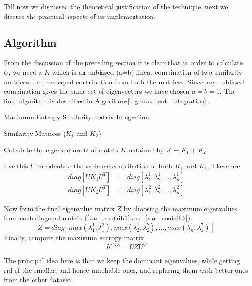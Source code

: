 Till now we discussed the theoretical justification of the technique, next we discuss the practical aspects of its implementation.

\subsection{Algorithm}
From the discussion of the preceding section it is clear that in order to calculate $U$, we need a $K$ which is an unbiased (a=b) linear combination of two similarity matrices, i.e., has equal contribution from both the matrices. Since any unbiased combination gives the same set of eigenvectors we have chosen $a=b=1$. The final algorithm is described in Algorithm-\ref{alg:max_ent_integration}.

\begin{algorithm}[h]
\caption{Maximum Entropy Similarity matrix Integration}
\label{alg:max_ent_integration}
\begin{algorithmic}[1]
\REQUIRE Similarity Matrices ($K_{1}$ and $K_{2}$) 

\STATE Calculate the eigenvectors $U$ of matrix $K$ obtained by $K = K_{1} + K_{2}$.

\STATE Use this $U$ to calculate the variance contribution of both $K_{1}$ and $K_{2}$. These are  
\begin{eqnarray}
	diag[UK_{1}U^{T}] &=&  diag[\lambda^{1}_{1},\lambda^{1}_{2},\dots,\lambda^{1}_{n}] \label{var_contrib1} \\
	diag[UK_{2}U^{T}] &=&  diag[\lambda^{2}_{1},\lambda^{2}_{2},\dots,\lambda^{2}_{n}] \label{var_contrib2}
\end{eqnarray}

\STATE Now form the final eigenvalue matrix $Z$ by choosing the maximum eigenvalues from each diagonal matrix (\ref{var_contrib1} and \ref{var_contrib2}).
\begin{displaymath}
	Z =  diag[max(\lambda^{1}_{1},\lambda^{2}_{1}),max(\lambda^{1}_{2},\lambda^{2}_{2}),\dots,max(\lambda^{1}_{n},\lambda^{2}_{n})] 
\end{displaymath}
\STATE Finally, compute the maximum entropy matrix 
\begin{displaymath}
	K^{ME} = UZU^{T}
\end{displaymath}
\end{algorithmic}
\end{algorithm}  

The principal idea here is that we keep the dominant eigenvalues, while getting rid of the smaller, and hence 
unreliable ones, and replacing them with better ones from the other dataset. 
